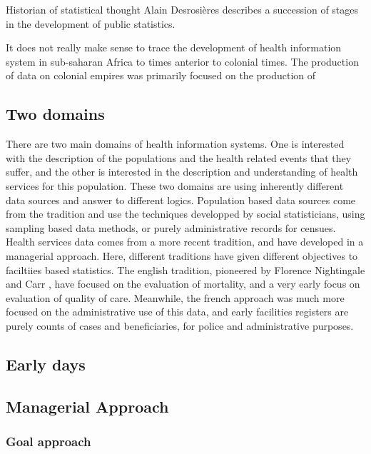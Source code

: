 Historian of statistical thought Alain Desrosières describes a succession of stages in the development of public statistics.

It does not really make sense to trace the development of health information system in sub-saharan Africa to times anterior to colonial times. The production of data on colonial empires was primarily focused on the production of

\subsection{Two domains}

There are two main domains of health information systems. One is interested with the description of the populations and the health related events that they suffer, and the other is interested in the description and understanding of health services for this population. These two domains are using inherently different data sources %
and answer to different logics. Population based data sources come from the tradition and use the techniques developped by social statisticians, using sampling based data methods, or purely administrative records for censues. Health services data comes from a more recent tradition, and have developed in a managerial approach. Here, different traditions have given different objectives to faciltiies based statistics. The english tradition, pioneered by Florence Nightingale and Carr , have focused on the evaluation of mortality, and a very early focus on evaluation of quality of care. Meanwhile, the french approach was much more focused on the administrative use of this data, and early facilities registers are purely counts of cases and beneficiaries, for police and administrative purposes.


\subsection{Early days}

\subsection{Managerial Approach}


\subsubsection{Goal approach}
\label{sec_goal}


